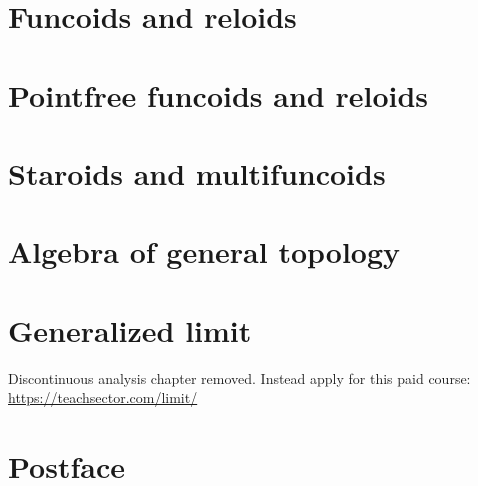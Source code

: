 \documentclass[a4paper,oneside,english,reqno]{amsbook}
\numberwithin{section}{chapter}
\begin{document}
\part{Funcoids and reloids}














\part{Pointfree funcoids and reloids}



\part{Staroids and multifuncoids}



\part{Algebra of general topology}



\part{Generalized limit}
Discontinuous analysis chapter removed.
Instead apply for this paid course:
\url{https://teachsector.com/limit/}

% 

\part{Postface}






\printindex{}




\addtocounter{figure}{-1}
\label{LASTFIGURE}
\end{document}
